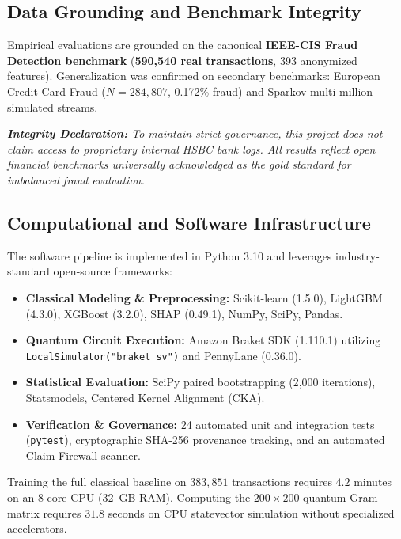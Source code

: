 \documentclass[10pt,a4paper]{article}
\begin{document}
\subsection{Data Grounding and Benchmark Integrity}
Empirical evaluations are grounded on the canonical \textbf{IEEE-CIS Fraud Detection benchmark} (\textbf{590,540 real transactions}, 393 anonymized features). Generalization was confirmed on secondary benchmarks: European Credit Card Fraud ($N=284,807$, 0.172\% fraud) and Sparkov multi-million simulated streams.

\vspace{1pt}
\noindent\textit{\textbf{Integrity Declaration:} To maintain strict governance, this project does not claim access to proprietary internal HSBC bank logs. All results reflect open financial benchmarks universally acknowledged as the gold standard for imbalanced fraud evaluation.}\par
\vspace{1pt}

\subsection{Computational and Software Infrastructure}
The software pipeline is implemented in Python 3.10 and leverages industry-standard open-source frameworks:
\begin{itemize}[leftmargin=*,itemsep=0.2pt,topsep=1pt]
\item \textbf{Classical Modeling \& Preprocessing:} Scikit-learn (1.5.0), LightGBM (4.3.0), XGBoost (3.2.0), SHAP (0.49.1), NumPy, SciPy, Pandas.
\item \textbf{Quantum Circuit Execution:} Amazon Braket SDK (1.110.1) utilizing \texttt{LocalSimulator("braket\_sv")} and PennyLane (0.36.0).
\item \textbf{Statistical Evaluation:} SciPy paired bootstrapping (2,000 iterations), Statsmodels, Centered Kernel Alignment (CKA).
\item \textbf{Verification \& Governance:} 24 automated unit and integration tests (\texttt{pytest}), cryptographic SHA-256 provenance tracking, and an automated Claim Firewall scanner.
\end{itemize}
Training the full classical baseline on $383,851$ transactions requires $4.2$ minutes on an 8-core CPU (32~GB RAM). Computing the $200 \times 200$ quantum Gram matrix requires $31.8$ seconds on CPU statevector simulation without specialized accelerators.
\end{document}
